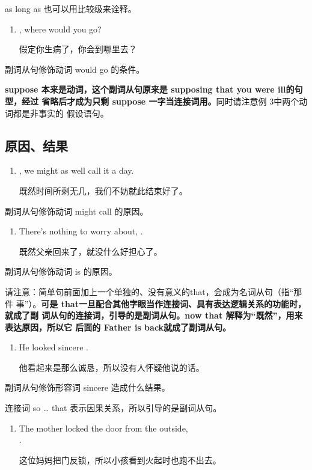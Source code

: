 as long as 也可以用比较级来诠释。
\begin{enumerate}[resume]
\item {} , where would you go?

  假定你生病了，你会到哪里去？
\end{enumerate}
副词从句修饰动词 would go 的条件。

\textbf{suppose 本来是动词，这个副词从句原来是 supposing that you were ill的句型，经过
  省略后才成为只剩 suppose 一字当连接词用。}同时请注意例 3中两个动词都是非事实的
假设语句。

\subsection{原因、结果}

\begin{enumerate}
\item {} , we might as
  well call it a day.

  既然时间所剩无几，我们不妨就此结束好了。
\end{enumerate}
副词从句修饰动词 might call 的原因。

\begin{enumerate}[resume]
\item There's nothing to worry about,  .

  既然父亲回来了，就没什么好担心了。
\end{enumerate}
副词从句修饰动词 is 的原因。

请注意：简单句前面加上一个单独的、没有意义的that，会成为名词从句（指“那件
事”）。\textbf{可是 that一旦配合其他字眼当作连接词、具有表达逻辑关系的功能时，就成了副
  词从句的连接词，引导的是副词从句。now that 解释为“既然”，用来表达原因，所以它
  后面的 Father is back就成了副词从句。}

\begin{enumerate}[resume]
\item He looked  sincere  .

他看起来是那么诚恳，所以没有人怀疑他说的话。
\end{enumerate}
副词从句修饰形容词 sincere 造成什么结果。

连接词 so \ldots{} that 表示因果关系，所以引导的是副词从句。

\begin{enumerate}[resume]
\item The mother locked the door from the outside,  \\
  .

  这位妈妈把门反锁，所以小孩看到火起时也跑不出去。
\end{enumerate}

